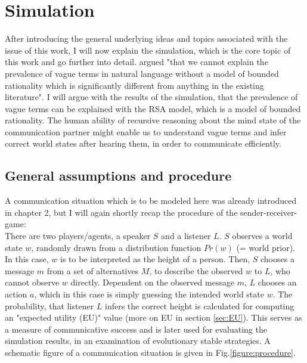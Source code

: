 \chapter{Simulation}
\label{chapter:simulation}

After introducing the general underlying ideas and topics associated with the issue of this work, I will now explain the simulation, which is the core topic of this work and go further into detail. 
\cite{lipman2009language} argued "that we cannot explain the prevalence of vague terms in
natural language without a model of bounded rationality which is significantly different from anything in the existing literature". I will argue with the results of the simulation, that the prevalence of vague terms can be explained with the RSA model, which is a model of bounded rationality.
The human ability of recursive reasoning about the mind state of the communication partner might enable us to understand vague terms and infer correct world states after hearing them, in order to communicate efficiently.

\section{General assumptions and procedure}
A communication situation which is to be modeled here was already introduced in chapter 2, but I will again shortly recap the procedure of the sender-receiver-game:\\

There are two players/agents, a speaker $S$ and a listener $L$. $S$ observes a world state $w$, randomly drawn from a distribution function $Pr(w)$ (= world prior). In this case, $w$ is to be interpreted as the height of a person. Then, $S$ chooses a message $m$ from a set of alternatives $M$, to describe the observed $w$ to $L$, who cannot observe $w$ directly. Dependent on the observed message $m$, $L$ chooses an action $a$, which in this case is simply guessing the intended world state $w$. The probability, that listener $L$ infers the correct height is calculated for computing an "expected utility (EU)" value (more on EU in section \ref{sec:EU}). This serves as a measure of communicative success and is later used for evaluating the simulation results, in an examination of evolutionary stable strategies. A schematic figure of a communication situation is given in Fig.\ref{figure:procedure}.\\

